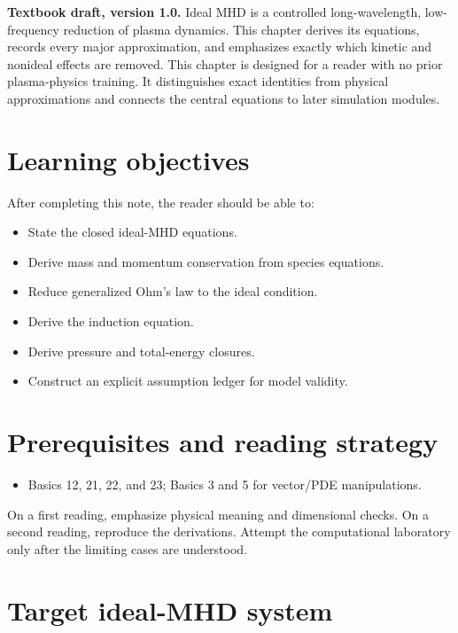 \documentclass[11pt]{article}
\begin{document}

\begin{overviewbox}
\textbf{Textbook draft, version 1.0.} Ideal MHD is a controlled long-wavelength, low-frequency reduction of plasma dynamics. This chapter derives its equations, records every major approximation, and emphasizes exactly which kinetic and nonideal effects are removed. This chapter is designed for a reader with no prior plasma-physics training. It distinguishes exact identities from physical approximations and connects the central equations to later simulation modules.
\end{overviewbox}

\ProjectTOC

\section{Learning objectives}
After completing this note, the reader should be able to:
\begin{itemize}[leftmargin=1.6em]
\item State the closed ideal-MHD equations.
\item Derive mass and momentum conservation from species equations.
\item Reduce generalized Ohm's law to the ideal condition.
\item Derive the induction equation.
\item Derive pressure and total-energy closures.
\item Construct an explicit assumption ledger for model validity.
\end{itemize}

\section{Prerequisites and reading strategy}
\begin{itemize}[leftmargin=1.6em]
\item Basics 12, 21, 22, and 23; Basics 3 and 5 for vector/PDE manipulations.
\end{itemize}
On a first reading, emphasize physical meaning and dimensional checks. On a second reading, reproduce the derivations. Attempt the computational laboratory only after the limiting cases are understood.

\section{Target ideal-MHD system}
\end{document}
